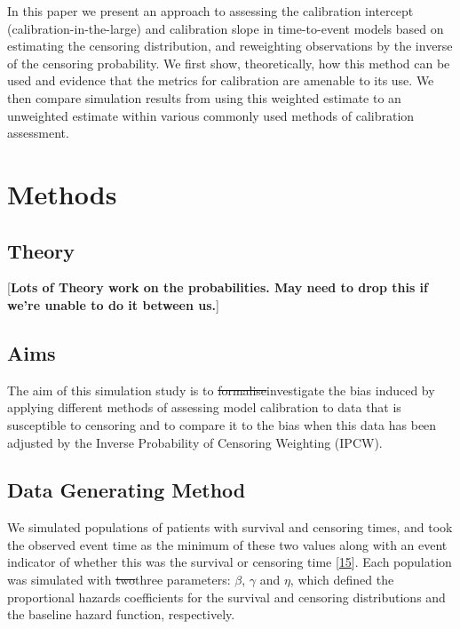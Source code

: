 \documentclass[
]{article}
\begin{document}
In this paper we present an approach to assessing the calibration intercept (calibration-in-the-large) and calibration slope in time-to-event models based on estimating the censoring distribution, and reweighting observations by the inverse of the censoring probability. We first show, theoretically, how this method can be used and evidence that the metrics for calibration are amenable to its use. We then compare simulation results from using this weighted estimate to an unweighted estimate within various commonly used methods of calibration assessment.

\hypertarget{methods-1}{%
\section{Methods}\label{methods-1}}

\hypertarget{theory}{%
\subsection{Theory}\label{theory}}

{[}\textbf{Lots of Theory work on the probabilities. May need to drop this if we're unable to do it between us.}{]}

\hypertarget{aims}{%
\subsection{Aims}\label{aims}}

The aim of this simulation study is to \sout{formalise}investigate the bias induced by applying different methods of assessing model calibration to data that is susceptible to censoring and to compare it to the bias when this data has been adjusted by the Inverse Probability of Censoring Weighting (IPCW).

\hypertarget{data-generating-method}{%
\subsection{Data Generating Method}\label{data-generating-method}}

We simulated populations of patients with survival and censoring times, and took the observed event time as the minimum of these two values along with an event indicator of whether this was the survival or censoring time {[}\protect\hyperlink{ref-burton_design_2006}{15}{]}. Each population was simulated with \sout{two}three parameters: \(\beta\), \(\gamma\) and \(\eta\), which defined the proportional hazards coefficients for the survival and censoring distributions and the baseline hazard function, respectively.
\end{document}
